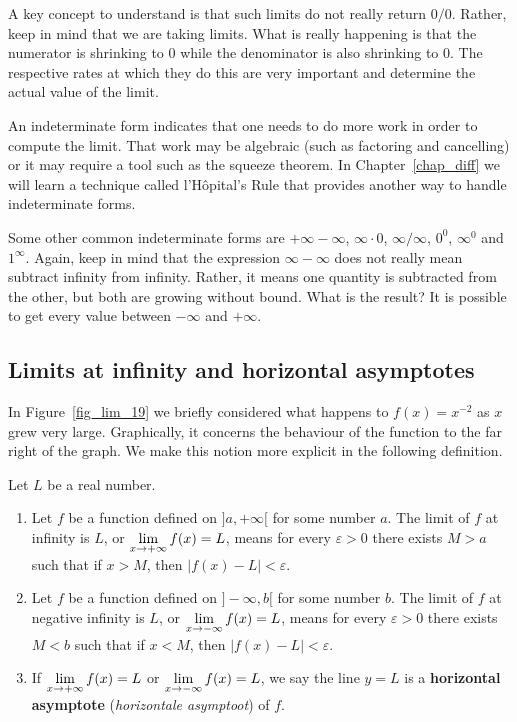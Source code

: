A key concept to understand is that such limits do not really return $0/0$. Rather, keep in mind that we are taking limits. What is really happening is that the numerator is shrinking to 0 while the denominator is also shrinking to 0. The respective rates at which they do this are very important and determine the actual value of the limit.

An indeterminate form indicates that one needs to do more work in order to compute the limit. That work may be algebraic (such as factoring and cancelling) or it may require a tool such as the squeeze theorem. In Chapter~\ref{chap_diff} we will learn a technique called l'H\^opital's Rule that provides another way to handle indeterminate forms.  
 
Some other common indeterminate forms are $+\infty-\infty$, $\infty\cdot 0$, $\infty/\infty$, $0^0$, $\infty^0$ and $1^{\infty}$. Again, keep in mind that the expression $\infty-\infty$ does not really mean subtract infinity from infinity. Rather, it means one quantity is subtracted from the other, but both are growing without bound. What is the result? It is possible to get every value between $-\infty$ and $+\infty$.

\fi

\subsection{Limits at infinity and horizontal asymptotes}

In Figure~\ref{fig_lim_19} we briefly considered what happens to $f(x) = x^{-2}$ as $x$ grew very large. Graphically, it concerns the behaviour of the function to the far right of the graph. We make this notion more explicit in the following definition.


\begin{definition}\label{def:limit_at_infinity}
Let $L$ be a real number.
\begin{enumerate}
\item Let $f$ be a function defined on $]a,+\infty[$ for some number $a$. The limit of $f$ at infinity is $L$, or $\displaystyle\lim_{x\rightarrow+\infty} f(x)=L$, means for every $\varepsilon>0$ there exists $M>a$ such that if $x > M$, then $|f(x)-L|<\varepsilon$.

\item Let $f$ be a function defined on $]-\infty,b[$ for some number $b$. The limit of $f$ at negative infinity is $L$, or $\displaystyle\lim_{x\rightarrow-\infty} f(x)=L$, means for every $\varepsilon>0$ there exists $M<b$ such that if $x < M$, then $|f(x)-L|<\varepsilon$. \\

 \item  If $\displaystyle\lim_{x\rightarrow+\infty} f(x)=L$ or $\displaystyle\lim_{x\rightarrow-\infty} f(x)=L$, we say the line $y=L$ is a \textbf{horizontal asymptote} (\textit{horizontale asymptoot}) of $f$.
\end{enumerate}

\end{definition}

